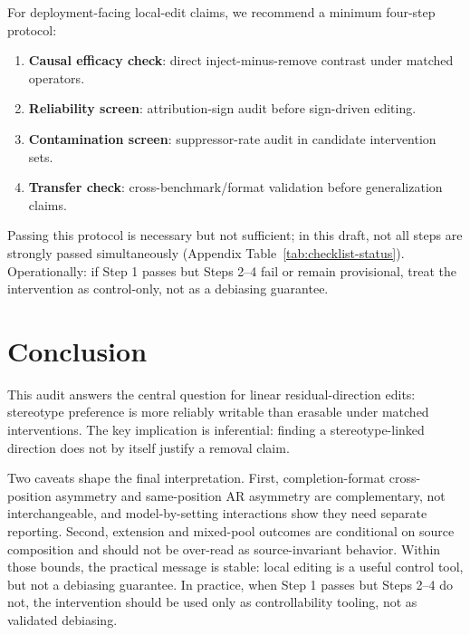 For deployment-facing local-edit claims, we recommend a minimum four-step protocol:
\begin{enumerate}[leftmargin=*]
  \item \textbf{Causal efficacy check}: direct inject-minus-remove contrast under matched operators.
  \item \textbf{Reliability screen}: attribution-sign audit before sign-driven editing.
  \item \textbf{Contamination screen}: suppressor-rate audit in candidate intervention sets.
  \item \textbf{Transfer check}: cross-benchmark/format validation before generalization claims.
\end{enumerate}
Passing this protocol is necessary but not sufficient; in this draft, not all steps are strongly passed simultaneously (Appendix Table~\ref{tab:checklist-status}). Operationally: if Step 1 passes but Steps 2--4 fail or remain provisional, treat the intervention as control-only, not as a debiasing guarantee.

\section{Conclusion}
This audit answers the central question for linear residual-direction edits: stereotype preference is more reliably writable than erasable under matched interventions. The key implication is inferential: finding a stereotype-linked direction does not by itself justify a removal claim.

Two caveats shape the final interpretation. First, completion-format cross-position asymmetry and same-position AR asymmetry are complementary, not interchangeable, and model-by-setting interactions show they need separate reporting. Second, extension and mixed-pool outcomes are conditional on source composition and should not be over-read as source-invariant behavior. Within those bounds, the practical message is stable: local editing is a useful control tool, but not a debiasing guarantee. In practice, when Step 1 passes but Steps 2--4 do not, the intervention should be used only as controllability tooling, not as validated debiasing.

